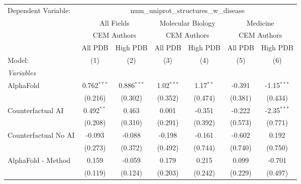\begingroup
\centering
\begin{tabular}{lcccccc}
   \tabularnewline \midrule \midrule
   Dependent Variable: & \multicolumn{6}{c}{num\_uniprot\_structures\_w\_disease}\\
 & \multicolumn{2}{c}{All Fields} & \multicolumn{2}{c}{Molecular Biology} & \multicolumn{2}{c}{Medicine} \\
\cmidrule(lr){2-3} \cmidrule(lr){4-5} \cmidrule(lr){6-7}
 & \multicolumn{2}{c}{CEM Authors} & \multicolumn{2}{c}{CEM Authors} & \multicolumn{2}{c}{CEM Authors} \\
\cmidrule(lr){2-3} \cmidrule(lr){4-5} \cmidrule(lr){6-7}
 & \multicolumn{1}{c}{All PDB} & \multicolumn{1}{c}{High PDB} & \multicolumn{1}{c}{All PDB} & \multicolumn{1}{c}{High PDB} & \multicolumn{1}{c}{All PDB} & \multicolumn{1}{c}{High PDB} \\
\cmidrule(lr){2-2} \cmidrule(lr){3-3} \cmidrule(lr){4-4} \cmidrule(lr){5-5} \cmidrule(lr){6-6} \cmidrule(lr){7-7}
   Model:                                                     & (1)           & (2)           & (3)          & (4)         & (5)     & (6)\\  
   \midrule
   \emph{Variables}\\
   AlphaFold                                                  & 0.762$^{***}$ & 0.886$^{***}$ & 1.02$^{***}$ & 1.17$^{**}$ & -0.391  & -1.15$^{***}$\\   
                                                              & (0.216)       & (0.302)       & (0.352)      & (0.474)     & (0.381) & (0.434)\\   
   Counterfactual AI                                          & 0.492$^{**}$  & 0.463         & 0.001        & -0.351      & -0.222  & -2.35$^{***}$\\   
                                                              & (0.208)       & (0.310)       & (0.291)      & (0.392)     & (0.573) & (0.771)\\   
   Counterfactual No AI                                       & -0.093        & -0.088        & -0.198       & -0.161      & -0.602  & 0.192\\   
                                                              & (0.273)       & (0.372)       & (0.492)      & (0.744)     & (0.740) & (0.750)\\   
   AlphaFold - Method                                         & 0.159         & -0.059        & 0.179        & 0.215       & 0.099   & -0.701\\   
                                                              & (0.119)       & (0.124)       & (0.203)      & (0.242)     & (0.229) & (0.497)\\   

\end{tabular}
